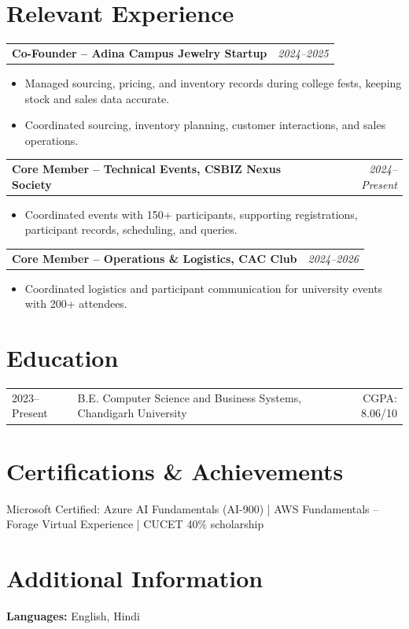\documentclass[a4paper,10pt]{article}
\begin{document}
\section{Relevant Experience}
\begin{tabularx}{\linewidth}{@{}Xr@{}}\textbf{Co-Founder -- Adina Campus Jewelry Startup} & \textit{2024--2025}\end{tabularx}
\begin{itemize}
\item Managed sourcing, pricing, and inventory records during college fests, keeping stock and sales data accurate.
\item Coordinated sourcing, inventory planning, customer interactions, and sales operations.
\end{itemize}
\begin{tabularx}{\linewidth}{@{}Xr@{}}\textbf{Core Member -- Technical Events, CSBIZ Nexus Society} & \textit{2024--Present}\end{tabularx}
\begin{itemize}\item Coordinated events with 150+ participants, supporting registrations, participant records, scheduling, and queries.\end{itemize}
\begin{tabularx}{\linewidth}{@{}Xr@{}}\textbf{Core Member -- Operations \& Logistics, CAC Club} & \textit{2024--2026}\end{tabularx}
\begin{itemize}\item Coordinated logistics and participant communication for university events with 200+ attendees.\end{itemize}

\section{Education}
\begin{tabularx}{\linewidth}{@{}lXr@{}}2023--Present & B.E. Computer Science and Business Systems, Chandigarh University & CGPA: 8.06/10\end{tabularx}

\section{Certifications \& Achievements}
Microsoft Certified: Azure AI Fundamentals (AI-900) \;|\; AWS Fundamentals -- Forage Virtual Experience \;|\; CUCET 40\% scholarship

\section{Additional Information}
\textbf{Languages:} English, Hindi
\end{document}
